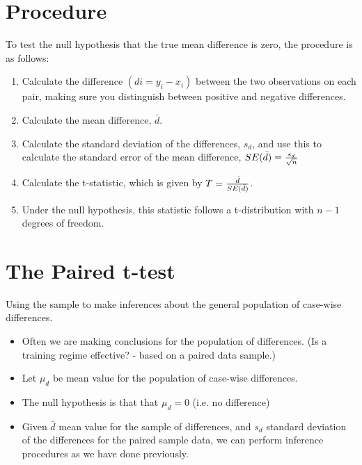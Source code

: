 \documentclass[]{report}
\begin{document}
\section{Procedure}
To test the null hypothesis that the true mean difference is zero, the procedure is as
follows:
\begin{enumerate}
\item Calculate the difference $(di = y_i − x_i)$ between the two observations on each pair,
making sure you distinguish between positive and negative differences.
\item Calculate the mean difference, $\bar{d}$.

\item Calculate the standard deviation of the differences, $s_d$, and use this to calculate the
standard error of the mean difference, $SE(\bar{d}) = {s_d \over \sqrt{n}}$

\item Calculate the t-statistic, which is given by $ T ={ \bar{d} \over SE(\bar{d})}$.

\item Under the null hypothesis, this statistic follows a t-distribution with $n − 1$ degrees of freedom.
\end{enumerate}



\section{The Paired t-test}
Using the sample to make inferences about the general population of case-wise differences.
\begin{itemize}
\item Often we are making conclusions for the population of differences. (Is a training regime effective? - based on a paired data sample.)
\item Let $\mu_d$ be mean value for the population of case-wise differences.
\item The null hypothesis is that that $\mu_d = 0$ (i.e. no difference)
\item Given $\bar{d}$ mean value for the sample of differences, and $s_d$ standard deviation of the differences for the paired sample data, we can perform inference procedures as we have done previously.
\end{itemize}
\end{document}
